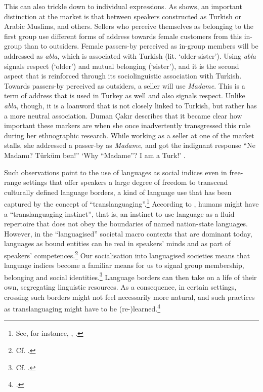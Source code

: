 This can also trickle down to individual expressions. As \citet{Duman2019} shows, an important distinction at the market is that between speakers constructed as Turkish or Arabic Muslims, and others. Sellers who perceive themselves as belonging to the first group use different forms of address towards female customers from this in-group than to outsiders. Female passers-by perceived as in-group members will be addressed as \textit{abla}, which is associated with Turkish (lit. ‘older-sister’). Using \textit{abla} signals respect (‘older’) and mutual belonging (‘sister’), and it is the second aspect that is reinforced through its sociolinguistic association with Turkish. Towards passers-by perceived as outsiders, a seller will use \textit{Madame}. This is a term of address that is used in Turkey as well and also signals respect. Unlike \textit{abla}, though, it is a loanword that is not closely linked to Turkish, but rather has a more neutral association. Duman Çakır describes that it became clear how important these markers are when she once inadvertently transgressed this rule during her ethnographic research. While working as a seller at one of the market stalls, she addressed a passer-by as \textit{Madame}, and got the indignant response “Ne Madamı? Türküm ben!” ‘Why “Madame”? I am a Turk!’ \citep{Duman2019}.

Such observations point to the use of languages as social indices even in free-range settings that offer speakers a large degree of freedom to transcend culturally defined language borders, a kind of language use that has been captured by the concept of “translanguaging”.\footnote{See, for instance, \citet{García2009}, \citet{GarcíaTupas2018}.} According to  \citet{LiWei2021}, humans might have a “translanguaging instinct”, that is, an instinct to use language as a fluid repertoire that does not obey the boundaries of named nation-state languages. However, in the “languagised” societal macro contexts that are dominant today, languages as bound entities can be real in speakers’ minds and as part of speakers’ competences.\footnote{Cf. \citet{JaspersMadsen2019}.} Our socialisation into languagised societies means that language indices become a familiar means for us to signal group membership, belonging and social identities.\footnote{Cf. \citet{Møller2019}.} Language borders can then take on a life of their own, segregating linguistic resources. As a consequence, in certain settings, crossing such borders might not feel necessarily more natural, and such practices as translanguaging might have to be (re\nobreakdash-)learned.\footnote{\citet{Ruuska2019}.}

